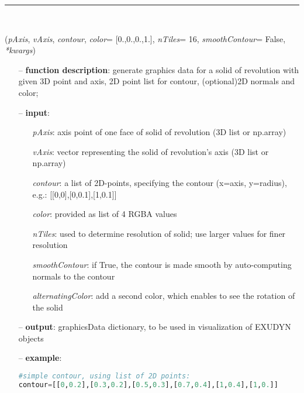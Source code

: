 \begin{itemize}[leftmargin=1.4cm]
\begin{itemize}[leftmargin=1.4cm]
\begin{itemize}[leftmargin=0.5cm]
\begin{itemize}[leftmargin=1.4cm]
\begin{itemize}[leftmargin=1.4cm]
\begin{itemize}[leftmargin=0.5cm]
\begin{itemize}[leftmargin=1.4cm]
\begin{itemize}[leftmargin=0.5cm]
%
\noindent\rule{8cm}{0.75pt}\vspace{1pt} \\ 
\begin{flushleft}
\label{sec:graphicsDataUtilities:GraphicsDataSolidOfRevolution}
({\it pAxis}, {\it vAxis}, {\it contour}, {\it color}= [0.,0.,0.,1.], {\it nTiles}= 16, {\it smoothContour}= False, {\it **kwargs})
\end{flushleft}
\setlength{\itemindent}{0.7cm}
\begin{itemize}[leftmargin=0.7cm]
  \item[--]  {\bf function description}: generate graphics data for a solid of revolution with given 3D point and axis, 2D point list for contour, (optional)2D normals and color;  \item[--]  {\bf input}: \vspace{-6pt}
  \begin{itemize}[leftmargin=1.2cm]
\setlength{\itemindent}{-0.7cm}
    \item[] {\it pAxis}: axis point of one face of solid of revolution (3D list or np.array)
    \item[] {\it    vAxis}: vector representing the solid of revolution's axis (3D list or np.array)
    \item[] {\it    contour}: a list of 2D-points, specifying the contour (x=axis, y=radius), e.g.: [[0,0],[0,0.1],[1,0.1]]
    \item[] {\it    color}: provided as list of 4 RGBA values
    \item[] {\it    nTiles}: used to determine resolution of solid; use larger values for finer resolution
    \item[] {\it    smoothContour}: if True, the contour is made smooth by auto-computing normals to the contour
    \item[] {\it    alternatingColor}: add a second color, which enables to see the rotation of the solid
  \end{itemize}
  \item[--]  {\bf output}: graphicsData dictionary, to be used in visualization of EXUDYN objects  \item[--]  {\bf example}: \vspace{-12pt}\ei\begin{lstlisting}[language=Python, xleftmargin=36pt]
#simple contour, using list of 2D points:
contour=[[0,0.2],[0.3,0.2],[0.5,0.3],[0.7,0.4],[1,0.4],[1,0.]]

\end{lstlisting}
\end{itemize}
\end{itemize}
\end{itemize}
\end{itemize}
\end{itemize}
\end{itemize}
\end{itemize}
\end{itemize}
\end{itemize}
